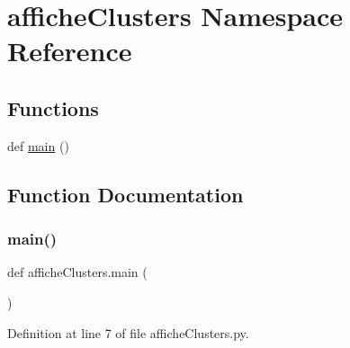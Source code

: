 \hypertarget{namespaceaffiche_clusters}{}\section{affiche\+Clusters Namespace Reference}
\label{namespaceaffiche_clusters}
\subsection*{Functions}
\begin{DoxyCompactItemize}
\item 
def \hyperlink{namespaceaffiche_clusters_a5b827a37da137dea9205119b9acea812}{main} ()
\end{DoxyCompactItemize}


\subsection{Function Documentation}
\mbox{\label{namespaceaffiche_clusters_a5b827a37da137dea9205119b9acea812}} 
\subsubsection{\texorpdfstring{main()}{main()}}
{\footnotesize\ttfamily def affiche\+Clusters.\+main (\begin{DoxyParamCaption}{ }\end{DoxyParamCaption})}



Definition at line 7 of file affiche\+Clusters.\+py.


